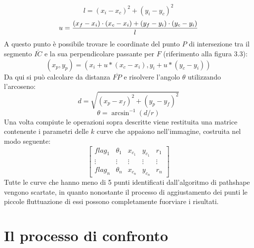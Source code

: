     $$l = (x_i-x_c)^2+(y_i-y_c)^2$$
    $$u = {(x_f-x_i) \cdot (x_c-x_i) + (y_f-y_i) \cdot (y_c-y_i) \over l} $$
    A questo punto è possibile trovare le coordinate del punto $P$ di intersezione tra il segmento $\overline{I C}$ e la sua perpendicolare passante per $F$ (riferimento alla figura 3.3):
    $$(x_p, y_p) = (x_i+u*(x_c-x_i), y_i+u*(y_c-y_i))$$
    Da qui si può calcolare da distanza $\overline{F P}$ e risolvere l'angolo $\theta$ utilizzando l'arcoseno:
    $$d = \sqrt{(x_p-x_f)^2+(y_p-y_f)^2}$$
    $$\theta = \arcsin^{-1}(d/r)$$
    Una volta compiute le operazioni sopra descritte viene restituita una matrice contenente i parametri delle $k$ curve che appaiono nell'immagine, costruita nel modo seguente:
    $$\begin{bmatrix} flag_1 & \theta_1 & x_{c_1} & y_{c_1} & r_1 \\ \vdots & \vdots & \vdots & \vdots & \vdots \\ flag_n & \theta_n & x_{c_n} & y_{c_n} & r_n \end{bmatrix}$$
    Tutte le curve che hanno meno di 5 punti identificati dall'algoritmo di pathshape vengono scartate, in quanto nonostante il processo di aggiustamento dei punti le piccole fluttuazione di essi possono completamente fuorviare i risultati.

\section{Il processo di confronto}


